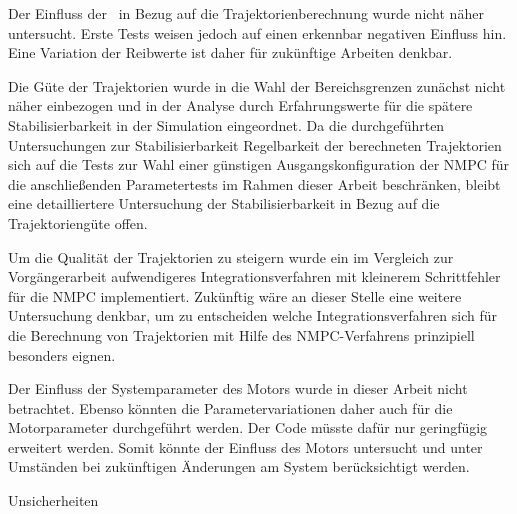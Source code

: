 Der Einfluss der \crb\ in Bezug auf die Trajektorienberechnung wurde nicht näher untersucht. Erste Tests weisen jedoch auf einen erkennbar negativen Einfluss hin. Eine Variation der Reibwerte ist daher für zukünftige Arbeiten denkbar.

Die Güte der Trajektorien wurde in die Wahl der Bereichsgrenzen zunächst nicht näher einbezogen und in der Analyse durch Erfahrungswerte für die spätere Stabilisierbarkeit in der Simulation eingeordnet. Da die durchgeführten Untersuchungen zur Stabilisierbarkeit \bzw Regelbarkeit der berechneten Trajektorien sich auf die Tests zur Wahl einer günstigen Ausgangskonfiguration der NMPC für die anschließenden Parametertests im Rahmen dieser Arbeit beschränken, bleibt eine detailliertere Untersuchung der Stabilisierbarkeit in Bezug auf die Trajektoriengüte offen.

Um die Qualität der Trajektorien zu steigern wurde ein im Vergleich zur Vorgängerarbeit aufwendigeres Integrationsverfahren mit kleinerem Schrittfehler für die NMPC implementiert. Zukünftig wäre an dieser Stelle eine weitere Untersuchung denkbar, um zu entscheiden welche Integrationsverfahren sich für die Berechnung von Trajektorien mit Hilfe des NMPC-Verfahrens prinzipiell besonders eignen. 

Der Einfluss der Systemparameter des Motors wurde in dieser Arbeit nicht betrachtet.
Ebenso könnten die Parametervariationen daher auch für die Motorparameter durchgeführt werden.
Der Code müsste dafür nur geringfügig erweitert werden.
Somit könnte der Einfluss des Motors untersucht und unter Umständen bei zukünftigen Änderungen am System berücksichtigt werden.

Unsicherheiten